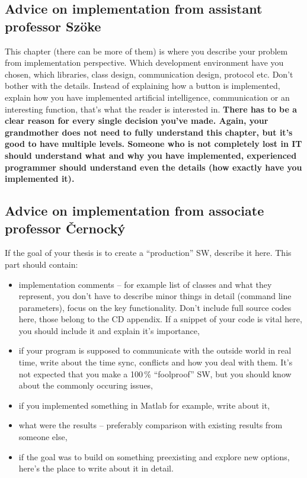 \subsection*{Advice on implementation from assistant professor Szöke}
This chapter (there can be more of them) is where you describe your problem from implementation perspective. Which development environment have you chosen, which libraries, class design, communication design, protocol etc. Don't bother with the details. Instead of explaining how a button is implemented, explain how you have implemented artificial intelligence, communication or an interesting function, that's what the reader is interested in. \bf There has to be a clear reason for every single decision you've made. \rm Again, your grandmother does not need to fully understand this chapter, but it's good to have multiple levels. Someone who is not completely lost in IT should understand what and why you have implemented, experienced programmer should understand even the details (how exactly have you implemented it).

\subsection*{Advice on implementation from associate professor Černocký}

If the goal of your thesis is to create a ``production'' SW, describe it here. This part should contain: 
\begin{itemize}
  \item{implementation comments -- for example list of classes and what they represent, you don't have to describe minor things in detail (command line parameters), focus on the key functionality. Don't include full source codes here, those belong to the CD appendix. If a snippet of your code is vital here, you should include it and explain it's importance,}
  \item{if your program is supposed to communicate with the outside world in real time, write about the time sync, conflicts and how you deal with them. It's not expected that you make a 100\,\% ``foolproof'' SW, but you should know about the commonly occuring issues,}
  \item{if you implemented something in Matlab for example, write about it,}
  \item{what were the results -- preferably comparison with existing results from someone else,}
  \item{if the goal was to build on something preexisting and explore new options, here's the place to write about it in detail.}
\end{itemize}

